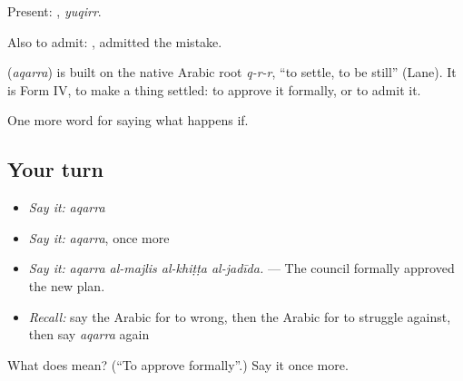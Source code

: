 Present: , \emph{yuqirr}.

Also to admit:  , admitted the mistake.

\begin{cousinweb}
\textbf{} (\emph{aqarra}) is built on the native Arabic root \emph{q-r-r}, \textquotedblleft{}to settle, to be still\textquotedblright{} (Lane). It is Form IV, to make a thing settled: to approve it formally, or to admit it.
\end{cousinweb}

\begin{grammarlens}[title={What you've built}]
One more word for saying what happens if.
\end{grammarlens}

\subsection*{Your turn}
\begin{itemize}
\raggedright
  \item \emph{Say it:} \emph{aqarra}
  \item \emph{Say it:} \emph{aqarra}, once more
  \item \emph{Say it:} \emph{aqarra al-majlis al-khiṭṭa al-jadīda.} — The council formally approved the new plan.
  \item \emph{Recall:} say the Arabic for to wrong, then the Arabic for to struggle against, then say \emph{aqarra} again
\end{itemize}

\begin{tcolorbox}[breakable,colback=teal!4,colframe=teal!35!black,title={Before you move on}]
What does  mean? (\textquotedblleft{}To approve formally\textquotedblright{}.) Say it once more.
\end{tcolorbox}
